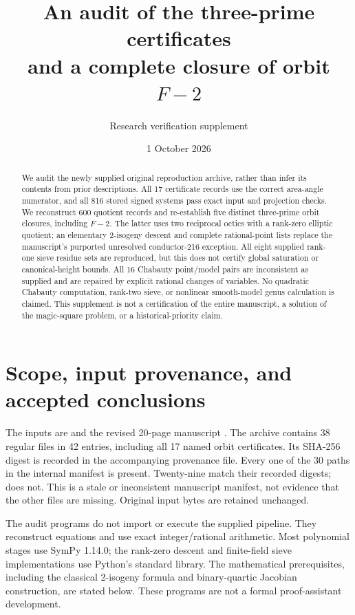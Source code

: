 \documentclass[11pt]{article}
\title{An audit of the three-prime certificates\\and a complete closure of orbit $F{-}2$}
\author{Research verification supplement}
\date{1 October 2026}
\theoremstyle{remark}\newtheorem{remark}[theorem]{Remark}
\begin{document}
\maketitle
\begin{abstract}
We audit the newly supplied original reproduction archive, rather than infer its contents from prior descriptions. All 17 certificate records use the correct area-angle numerator, and all 816 stored signed systems pass exact input and projection checks. We reconstruct 600 quotient records and re-establish five distinct three-prime orbit closures, including $F{-}2$. The latter uses two reciprocal octics with a rank-zero elliptic quotient; an elementary 2-isogeny descent and complete rational-point lists replace the manuscript's purported unresolved conductor-216 exception. All eight supplied rank-one sieve residue sets are reproduced, but this does not certify global saturation or canonical-height bounds. All 16 Chabauty point/model pairs are inconsistent as supplied and are repaired by explicit rational changes of variables. No quadratic Chabauty computation, rank-two sieve, or nonlinear smooth-model genus calculation is claimed. This supplement is not a certification of the entire manuscript, a solution of the magic-square problem, or a historical-priority claim.
\end{abstract}

\section{Scope, input provenance, and accepted conclusions}
The inputs are  and the revised 20-page manuscript . The archive contains 38 regular files in 42 entries, including all 17 named orbit certificates. Its SHA-256 digest is recorded in the accompanying provenance file. Every one of the 30 paths in the internal manifest is present. Twenty-nine match their recorded digests;  does not. This is a stale or inconsistent manuscript manifest, not evidence that the other files are missing. Original input bytes are retained unchanged.

The audit programs do not import or execute the supplied pipeline. They reconstruct equations and use exact integer/rational arithmetic. Most polynomial stages use SymPy 1.14.0; the rank-zero descent and finite-field sieve implementations use Python's standard library. The mathematical prerequisites, including the classical 2-isogeny formula and binary-quartic Jacobian construction, are stated below. These programs are not a formal proof-assistant development.
\end{document}
